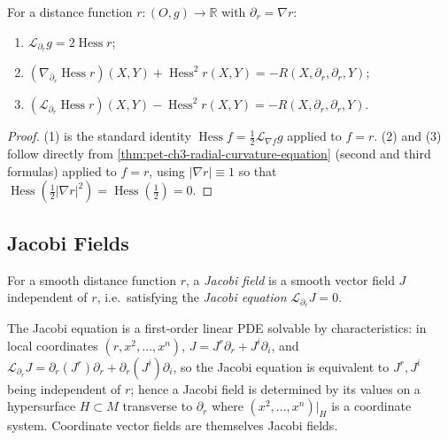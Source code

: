 \begin{proposition}[Proposition 3.2.11]
  \label{prop:pet-ch3-distance-function-curvature-equations}
  \leanok
  For a distance function $r:(O,g)\to\mathbb R$ with $\partial_r=\nabla r$:
  \begin{enumerate}
    \item[(1)] $\mathcal L_{\partial_r}g=2\operatorname{Hess}r$;
    \item[(2)] $(\nabla_{\partial_r}\operatorname{Hess}r)(X,Y)+\operatorname{Hess}^2r(X,Y)=-R(X,\partial_r,\partial_r,Y)$;
    \item[(3)] $(\mathcal L_{\partial_r}\operatorname{Hess}r)(X,Y)-\operatorname{Hess}^2r(X,Y)=-R(X,\partial_r,\partial_r,Y)$.
  \end{enumerate}
\end{proposition}
\begin{proof}
  \leanok
  (1) is the standard identity $\operatorname{Hess}f=\tfrac12\mathcal
  L_{\nabla f}g$ applied to $f=r$. (2) and (3) follow directly from
  \cref{thm:pet-ch3-radial-curvature-equation} (second and third formulas)
  applied to $f=r$, using $|\nabla r|\equiv1$ so that
  $\operatorname{Hess}(\tfrac12|\nabla r|^2)=\operatorname{Hess}(\tfrac12)=0$.
\end{proof}

\subsection{Jacobi Fields}

\begin{definition}
  \label{def:pet-ch3-jacobi-field}
  \leanok
  For a smooth distance function $r$, a \emph{Jacobi field} is a smooth vector
  field $J$ independent of $r$, i.e.\ satisfying the \emph{Jacobi equation}
  $\mathcal L_{\partial_r}J=0$.
\end{definition}

\begin{remark}
  \label{rem:pet-ch3-jacobi-field-construction}
  \leanok
  The Jacobi equation is a first-order linear PDE solvable by characteristics: in
  local coordinates $(r,x^2,\dots,x^n)$, $J=J^r\partial_r+J^i\partial_i$, and
  $\mathcal L_{\partial_r}J=\partial_r(J^r)\partial_r+\partial_r(J^i)\partial_i$, so the Jacobi
  equation is equivalent to $J^r,J^i$ being independent of $r$; hence a Jacobi
  field is determined by its values on a hypersurface $H\subset M$ transverse to
  $\partial_r$ where $(x^2,\dots,x^n)|_H$ is a coordinate system. Coordinate
  vector fields are themselves Jacobi fields.
\end{remark}

